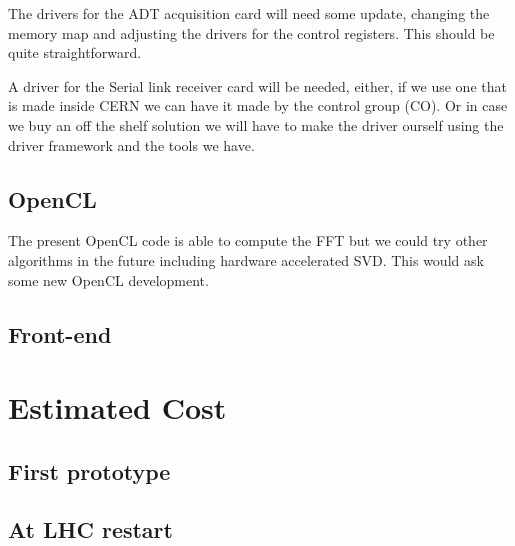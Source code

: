 	The drivers for the \gls{ADT} acquisition card will need some update, changing the memory map and adjusting the drivers for the control registers. This should be quite straightforward.

	A driver for the Serial link receiver card will be needed, either, if we use one that is made inside \gls{CERN} we can have it made by the control group (CO). Or in case we buy an off the shelf solution we will have to make the driver ourself using the driver framework and the tools we have.

	\subsection{OpenCL}

	The present \gls{OpenCL} code is able to compute the \gls{FFT} but we could try other algorithms in the future including hardware accelerated \gls{SVD}. This would ask some new \gls{OpenCL} development.

	\subsection{Front-end}

	

\section{Estimated Cost}

	\subsection{First prototype}

	\subsection{At LHC restart}